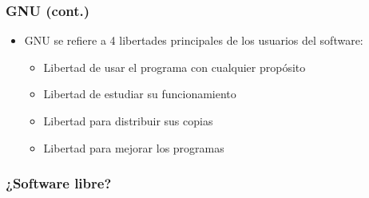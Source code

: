 \begin{frame}
	\frametitle{GNU (cont.)}
	\begin{itemize}
		\item GNU se refiere a 4 libertades principales de los usuarios del software:
		\begin{itemize}
			\item Libertad de usar el programa con cualquier propósito
			\item Libertad de estudiar su funcionamiento
			\item Libertad para distribuir sus copias
			\item Libertad para mejorar los programas
		\end{itemize}
	\end{itemize}
\end{frame}

\begin{frame}
	\frametitle{¿Software libre?}
	\begin{figure}
		\centering
	\end{figure}
\end{frame}

